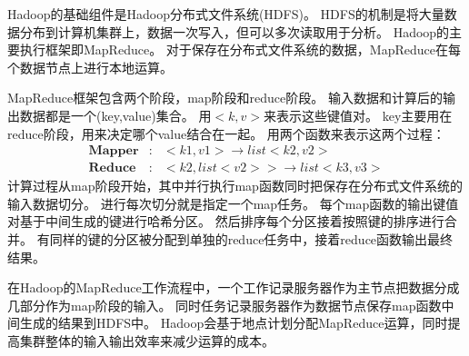 Hadoop的基础组件是Hadoop分布式文件系统(HDFS)。
HDFS的机制是将大量数据分布到计算机集群上，数据一次写入，但可以多次读取用于分析。
Hadoop的主要执行框架即MapReduce。
对于保存在分布式文件系统的数据，MapReduce在每个数据节点上进行本地运算。
\def\HDFSfront{
	\path (0,0) node(Splitn) [rectangle,draw] {Split(n)}
			(0,1) node {$\cdots$}
			(0,2) node(Split3) [rectangle,draw] {Split(3)}
			(0,3) node(Split2) [rectangle,draw] {Split(2)}
			(0,4) node(Split1) [rectangle,draw] {Split(1)}
			(0,5.5) node {\textbf{HDFS}};
	\draw (-1,-1) rectangle (1,6);
}
\def\HDFSend{
	\path (10,0) node(Partn) [rectangle,draw] {Part(n)}
			(10,1) node {$\cdots$}
			(10,2) node(Part3) [rectangle,draw] {Part(3)}
			(10,3) node(Part2) [rectangle,draw] {Part(2)}
			(10,4) node(Part1) [rectangle,draw] {Part(1)}
			(10,5.5) node {\textbf{HDFS}};
	\draw (9,-1) rectangle (11,6);
}
\def\mapper{
	\path (3.5,-1) node(Mapper4) [rectangle,draw] {\textbf{Mapper}}
			(3.5,0.5) node {$\cdots$}
			(3.5,2) node(Mapper3) [rectangle,draw] {\textbf{Mapper}}
			(3.5,3.5) node(Mapper2) [rectangle,draw] {\textbf{Mapper}}
			(3.5,5) node(Mapper1) [rectangle,draw] {\textbf{Mapper}};
}
\def\reducer{
	\path (7,1) node(Reducer2) [rectangle,draw] {\textbf{Reducer}}
			(7,2.5) node {$\cdots$}
			(7,4) node(Reducer1) [rectangle,draw] {\textbf{Reducer}};
}
\begin{center}
\end{center}
MapReduce框架包含两个阶段，map阶段和reduce阶段。
输入数据和计算后的输出数据都是一个(key,value)集合。
用$<k,v>$来表示这些键值对。
key主要用在reduce阶段，用来决定哪个value结合在一起。
用两个函数来表示这两个过程：
\begin{eqnarray}
\mathbf{Mapper} &:& <k1,v1> \rightarrow list<k2,v2> \\
\mathbf{Reduce} &:& <k2,list<v2>> \rightarrow list<k3,v3>
\end{eqnarray}
计算过程从map阶段开始，其中并行执行map函数同时把保存在分布式文件系统的输入数据切分。
进行每次切分就是指定一个map任务。
每个map函数的输出键值对基于中间生成的键进行哈希分区。
然后排序每个分区接着按照键的排序进行合并。
有同样的键的分区被分配到单独的reduce任务中，接着reduce函数输出最终结果。

在Hadoop的MapReduce工作流程中，一个工作记录服务器作为主节点把数据分成几部分作为map阶段的输入。
同时任务记录服务器作为数据节点保存map函数中间生成的结果到HDFS中。
Hadoop会基于地点计划分配MapReduce运算，同时提高集群整体的输入输出效率来减少运算的成本。
